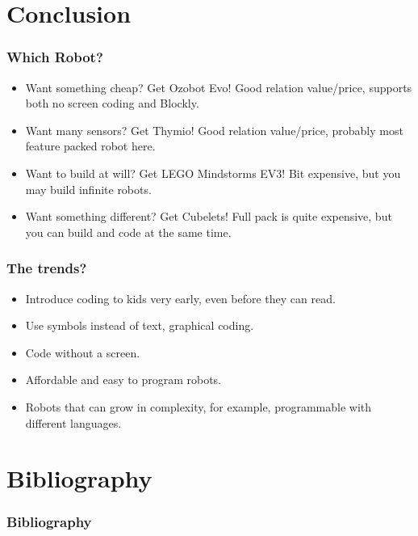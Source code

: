 \documentclass{beamer}
\begin{document}

\section{Conclusion}
\begin{frame}
\frametitle{Which Robot?}
\begin{itemize}[<+->]
	\item Want something cheap? Get Ozobot Evo! Good relation value/price, supports both no screen coding and Blockly.
	\item Want many sensors? Get Thymio! Good relation value/price, probably most feature packed robot here.
	\item Want to build at will? Get LEGO Mindstorms EV3! Bit expensive, but you may build infinite robots.
	\item Want something different? Get Cubelets! Full pack is quite expensive, but you can build and code at the same time.
\end{itemize}
\end{frame}


\begin{frame}
\frametitle{The trends?}
\begin{itemize}[<+->]
	\item Introduce coding to kids very early, even before they can read.
	\item Use symbols instead of text, graphical coding.
	\item Code without a screen.
	\item Affordable and easy to program robots.
	\item Robots that can grow in complexity, for example, programmable with different languages.
\end{itemize}
\end{frame}


\section{Bibliography}
\begin{frame}
\frametitle{Bibliography}
	{\scriptsize
        
    	\nocite{*}
    	
 	}
\end{frame}
\end{document}

